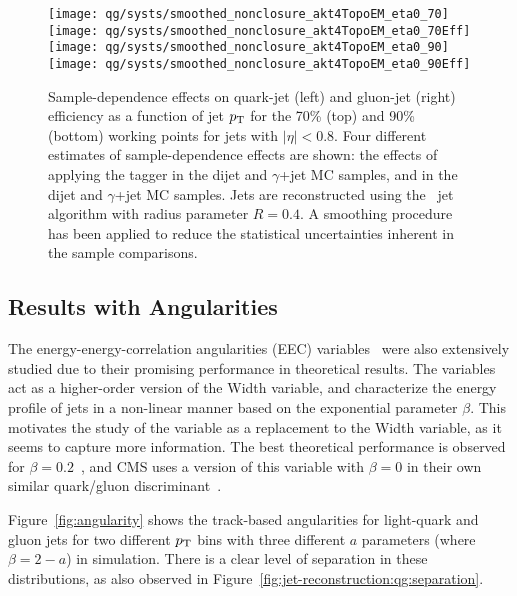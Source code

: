 \begin{figure*}[htbp]
\begin{center}
\texttt{[image: qg/systs/smoothed\_nonclosure\_akt4TopoEM\_eta0\_70]}
\texttt{[image: qg/systs/smoothed\_nonclosure\_akt4TopoEM\_eta0\_70Eff]} \\
\texttt{[image: qg/systs/smoothed\_nonclosure\_akt4TopoEM\_eta0\_90]}
\texttt{[image: qg/systs/smoothed\_nonclosure\_akt4TopoEM\_eta0\_90Eff]} \\
\caption{ Sample-dependence effects on quark-jet (left) and gluon-jet (right) efficiency as a function
of jet $p_{\text{T}}$ for the 70\% (top) and 90\% (bottom) working points for jets with $|\eta|<0.8$.  Four different estimates
of sample-dependence effects are shown: the effects of applying the tagger in the 
dijet and $\gamma$+jet  MC samples, and in the dijet and $\gamma$+jet \Herwigpp MC samples.  
Jets are reconstructed using the \AKT\ jet algorithm with radius parameter $R=0.4$. 
A smoothing procedure has been applied to reduce the statistical uncertainties inherent in the
sample comparisons. 
}
\label{fig:jet-reconstruction:qg:extractSyst2}
\end{center}
\end{figure*}

\FloatBarrier

\subsection{Results with Angularities}
\label{qg:angularities}

The energy-energy-correlation angularities (EEC) variables~\cite{EEC} were also extensively studied due to their promising performance in theoretical results. The variables act as a higher-order version of the Width variable, and characterize the energy profile of jets in a non-linear manner based on the exponential parameter $\beta$. This motivates the study of the variable as a replacement to the Width variable, as it seems to capture more information. The best theoretical performance is observed for $\beta = 0.2$~\cite{EEC}, and CMS uses a version of this variable with $\beta = 0$ in their own similar quark/gluon discriminant~\cite{CMS:2013kfa}. 

Figure~\ref{fig:angularity} shows the  track-based angularities for
light-quark and gluon jets for two different $p_{\text{T}}$ bins with three different $a$ parameters (where $\beta = 2 - a$) in \Pythia simulation. There is a clear level of separation in these distributions, as also observed in Figure~\ref{fig:jet-reconstruction:qg:separation}.

